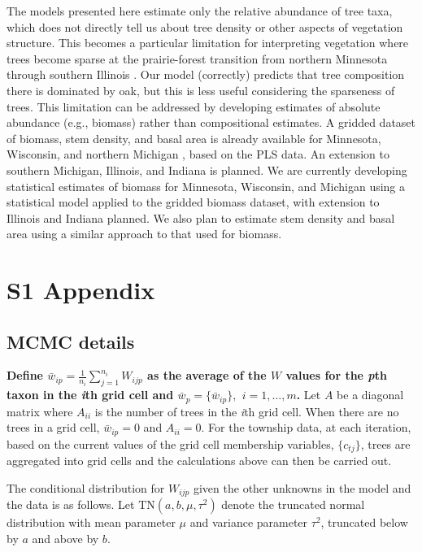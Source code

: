 \documentclass[10pt,letterpaper]{article}
\begin{document}
The models presented here estimate only the relative
abundance of tree taxa, which does not directly tell us about tree
density or other aspects of vegetation structure. This becomes a particular
limitation for interpreting vegetation where trees become sparse at
the prairie-forest transition from northern Minnesota through southern
Illinois \cite{transeau1935prairie}. Our model (correctly) predicts
that tree composition there is dominated by oak, but this is less
useful considering the sparseness of trees. This limitation can be
addressed by developing estimates of absolute abundance (e.g., biomass)
rather than compositional estimates. A gridded dataset of biomass,
stem density, and basal area is already available for Minnesota, Wisconsin,
and northern Michigan \cite{goring2015composition}, based on the
PLS data. An extension to southern Michigan, Illinois, and Indiana
is planned. We are currently developing statistical estimates of biomass
for Minnesota, Wisconsin, and Michigan using a statistical model applied
to the gridded biomass dataset, with extension to Illinois and Indiana
planned. We also plan to estimate stem density and basal area using
a similar approach to that used for biomass.



\section*{S1 Appendix}
\label{SI}

\subsection*{MCMC details}

{\bf Define $\bar{w}_{ip}=\frac{1}{n_{i}}{\displaystyle \sum_{j=1}^{n_{i}}W_{ijp}}$
as the average of the $W$ values for the \emph{p}th taxon in the \emph{i}th
grid cell and $\bar{w}_{p}=\{\bar{w}_{ip}\},$ $i=1,\ldots,m$.} Let
$A$ be a diagonal matrix where $A_{ii}$ is the number of trees in
the \emph{i}th grid cell. When there are no trees in a grid cell, $\bar{w}_{ip}=0$
and $A_{ii}=0$. For the township data, at each iteration, based on
the current values of the grid cell membership variables, $\{c_{tj}\}$,
trees are aggregated into grid cells and the calculations above can
then be carried out.

The conditional distribution for $W_{ijp}$ given the other unknowns
in the model and the data is as follows. Let $\mbox{TN}(a,b,\mu,\tau^{2})$
denote the truncated normal distribution with mean parameter $\mu$
and variance parameter $\tau^{2}$, truncated below by $a$ and above
by $b$. 
\end{document}
